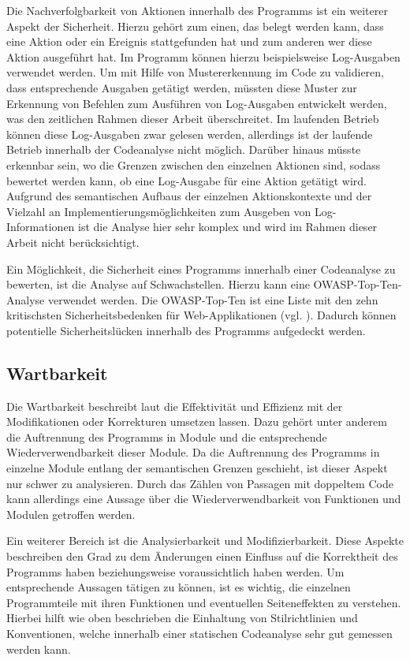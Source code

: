 \documentclass[
	oneside,  %
	ngerman, 
	final, 
	11pt, 
	a4paper, 
	1.1headlines, 
	headinclude=false, 
	footinclude=false, 
	mpinclude=false, 
	pagesize, 
	onecolumn, 
	titlepage, 
	parskip=half, 
	headsepline, 
	chapterprefix=false, 
	version=first, 
	listof=totoc, 
	bibliography=totoc, 
	toc=graduated, 
	fleqn
]{scrbook}
\begin{document}
Die Nachverfolgbarkeit von Aktionen innerhalb des Programms ist ein weiterer Aspekt der Sicherheit.
Hierzu gehört zum einen, das belegt werden kann, dass eine Aktion oder ein Ereignis stattgefunden hat und zum anderen wer diese Aktion ausgeführt hat.
Im Programm können hierzu beispielsweise Log-Ausgaben verwendet werden.
Um mit Hilfe von Mustererkennung im Code zu validieren, dass entsprechende Ausgaben getätigt werden, müssten 
diese Muster zur Erkennung von Befehlen zum Ausführen von Log-Ausgaben entwickelt werden, was den zeitlichen Rahmen dieser Arbeit überschreitet.
Im laufenden Betrieb können diese Log-Ausgaben zwar gelesen werden, allerdings ist der laufende Betrieb innerhalb der Codeanalyse nicht möglich.
Darüber hinaus müsste erkennbar sein, wo die Grenzen zwischen den einzelnen Aktionen sind, sodass bewertet werden kann, ob eine Log-Ausgabe für eine Aktion getätigt wird.
Aufgrund des semantischen Aufbaus der einzelnen Aktionskontexte und der Vielzahl an Implementierungsmöglichkeiten zum Ausgeben von Log-Informationen ist die Analyse hier sehr komplex und wird im Rahmen dieser Arbeit nicht berücksichtigt.

Ein Möglichkeit, die Sicherheit eines Programms innerhalb einer Codeanalyse zu bewerten, ist die Analyse auf Schwachstellen.
Hierzu kann eine \acf{OWASP}-Top-Ten-Analyse verwendet werden. 
Die \acs{OWASP}-Top-Ten ist eine Liste mit den zehn kritischsten Sicherheitsbedenken für Web-Applikationen (vgl. \cite{Ow2020}).
Dadurch können potentielle Sicherheitslücken innerhalb des Programms aufgedeckt werden.

\subsection{Wartbarkeit}
Die Wartbarkeit beschreibt laut \cite{ISO-25010} die Effektivität und Effizienz mit der Modifikationen oder Korrekturen umsetzen lassen.
Dazu gehört unter anderem die Auftrennung des Programms in Module und die entsprechende Wiederverwendbarkeit dieser Module.
Da die Auftrennung des Programms in einzelne Module entlang der semantischen Grenzen geschieht, ist dieser Aspekt nur schwer zu analysieren.
Durch das Zählen von Passagen mit doppeltem Code kann allerdings eine Aussage über die Wiederverwendbarkeit von Funktionen und Modulen getroffen werden.

Ein weiterer Bereich ist die Analysierbarkeit und Modifizierbarkeit.
Diese Aspekte beschreiben den Grad zu dem Änderungen einen Einfluss auf die Korrektheit des Programms haben beziehungsweise voraussichtlich haben werden.
Um entsprechende Aussagen tätigen zu können, ist es wichtig, die einzelnen Programmteile mit ihren Funktionen und eventuellen Seiteneffekten zu verstehen.
Hierbei hilft wie oben beschrieben die Einhaltung von Stilrichtlinien und Konventionen, welche innerhalb einer statischen Codeanalyse sehr gut gemessen werden kann.
\end{document}
